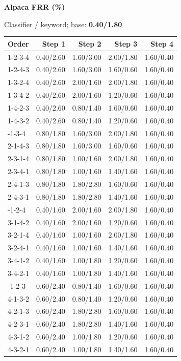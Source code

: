 \hfill
\begin{minipage}[t]{0.325\linewidth}
\centering
{\bfseries Alpaca FRR (\%)}\par
{\small Classifier / keyword; base: \textbf{0.40/1.80}}\par\vspace{5pt}
\small\setlength{\tabcolsep}{3.5pt}\renewcommand{\arraystretch}{1.19}
\begin{tabular}{@{}lrrrr@{}}
\toprule Order & Step 1 & Step 2 & Step 3 & Step 4 \\
\midrule
1-2-3-4 & 0.40/2.60 & 1.60/3.00 & 2.00/1.80 & 1.60/0.40 \\
1-2-4-3 & 0.40/2.60 & 1.60/3.00 & 1.60/0.60 & 1.60/0.40 \\
1-3-2-4 & 0.40/2.60 & 2.00/1.60 & 2.00/1.80 & 1.60/0.40 \\
1-3-4-2 & 0.40/2.60 & 2.00/1.60 & 1.20/0.60 & 1.60/0.40 \\
1-4-2-3 & 0.40/2.60 & 0.80/1.40 & 1.60/0.60 & 1.60/0.40 \\
1-4-3-2 & 0.40/2.60 & 0.80/1.40 & 1.20/0.60 & 1.60/0.40 \\
\addlinespace[3pt]
2-1-3-4 & 0.80/1.80 & 1.60/3.00 & 2.00/1.80 & 1.60/0.40 \\
2-1-4-3 & 0.80/1.80 & 1.60/3.00 & 1.60/0.60 & 1.60/0.40 \\
2-3-1-4 & 0.80/1.80 & 1.00/1.60 & 2.00/1.80 & 1.60/0.40 \\
2-3-4-1 & 0.80/1.80 & 1.00/1.60 & 1.40/1.60 & 1.60/0.40 \\
2-4-1-3 & 0.80/1.80 & 1.80/2.80 & 1.60/0.60 & 1.60/0.40 \\
2-4-3-1 & 0.80/1.80 & 1.80/2.80 & 1.40/1.60 & 1.60/0.40 \\
\addlinespace[3pt]
3-1-2-4 & 0.40/1.60 & 2.00/1.60 & 2.00/1.80 & 1.60/0.40 \\
3-1-4-2 & 0.40/1.60 & 2.00/1.60 & 1.20/0.60 & 1.60/0.40 \\
3-2-1-4 & 0.40/1.60 & 1.00/1.60 & 2.00/1.80 & 1.60/0.40 \\
3-2-4-1 & 0.40/1.60 & 1.00/1.60 & 1.40/1.60 & 1.60/0.40 \\
3-4-1-2 & 0.40/1.60 & 1.00/1.80 & 1.20/0.60 & 1.60/0.40 \\
3-4-2-1 & 0.40/1.60 & 1.00/1.80 & 1.40/1.60 & 1.60/0.40 \\
\addlinespace[3pt]
4-1-2-3 & 0.60/2.40 & 0.80/1.40 & 1.60/0.60 & 1.60/0.40 \\
4-1-3-2 & 0.60/2.40 & 0.80/1.40 & 1.20/0.60 & 1.60/0.40 \\
4-2-1-3 & 0.60/2.40 & 1.80/2.80 & 1.60/0.60 & 1.60/0.40 \\
4-2-3-1 & 0.60/2.40 & 1.80/2.80 & 1.40/1.60 & 1.60/0.40 \\
4-3-1-2 & 0.60/2.40 & 1.00/1.80 & 1.20/0.60 & 1.60/0.40 \\
4-3-2-1 & 0.60/2.40 & 1.00/1.80 & 1.40/1.60 & 1.60/0.40 \\
\bottomrule
\end{tabular}
\end{minipage}
